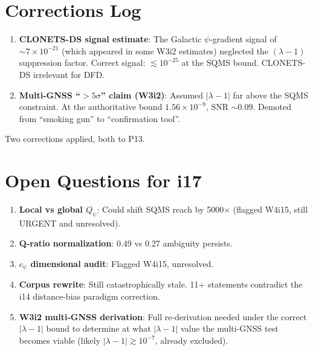 \documentclass[11pt]{article}
\newcommand{\ee}[1]{\times 10^{#1}}
\begin{document}
\section*{Corrections Log}

\begin{enumerate}
\item \textbf{CLONETS-DS signal estimate}: The Galactic $\psi$-gradient
  signal of $\sim 7\ee{-21}$ (which appeared in some W3i2 estimates)
  neglected the $(\lambda-1)$ suppression factor. Correct signal:
  $\lesssim 10^{-25}$ at the SQMS bound. CLONETS-DS irrelevant for DFD.
\item \textbf{Multi-GNSS ``$>5\sigma$'' claim (W3i2)}: Assumed
  $|\lambda-1|$ far above the SQMS constraint. At the authoritative
  bound $1.56\ee{-9}$, SNR $\sim 0.09$. Demoted from ``smoking gun''
  to ``confirmation tool''.
\end{enumerate}

Two corrections applied, both to P13.

\section*{Open Questions for i17}

\begin{enumerate}
\item \textbf{Local vs global $Q_\psi$}: Could shift SQMS reach by
  5000$\times$ (flagged W4i15, still URGENT and unresolved).
\item \textbf{Q-ratio normalization}: 0.49 vs 0.27 ambiguity persists.
\item \textbf{$c_\psi$ dimensional audit}: Flagged W4i15, unresolved.
\item \textbf{Corpus rewrite}: Still catastrophically stale. 11+
  statements contradict the i14 distance-bias paradigm correction.
\item \textbf{W3i2 multi-GNSS derivation}: Full re-derivation needed
  under the correct $|\lambda-1|$ bound to determine at what
  $|\lambda-1|$ value the multi-GNSS test becomes viable (likely
  $|\lambda-1| \gtrsim 10^{-7}$, already excluded).
\end{enumerate}
\end{document}
